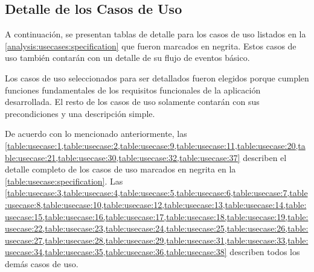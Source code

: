 \subsection{Detalle de los Casos de Uso}
A continuación, se presentan tablas de detalle para los casos de uso listados en la \autoref{analysis:usecases:specification} que fueron marcados en negrita. Estos casos de uso también contarán con un detalle de su flujo de eventos básico.

Los casos de uso seleccionados para ser detallados fueron elegidos porque cumplen funciones fundamentales de los requisitos funcionales de la aplicación desarrollada. El resto de los casos de uso solamente contarán con sus precondiciones y una descripción simple.

De acuerdo con lo mencionado anteriormente, las \cref{table:usecase:1,table:usecase:2,table:usecase:9,table:usecase:11,table:usecase:20,table:usecase:21,table:usecase:30,table:usecase:32,table:usecase:37} describen el detalle completo de los casos de uso marcados en negrita en la \autoref{table:usecase:specification}. Las \cref{table:usecase:3,table:usecase:4,table:usecase:5,table:usecase:6,table:usecase:7,table:usecase:8,table:usecase:10,table:usecase:12,table:usecase:13,table:usecase:14,table:usecase:15,table:usecase:16,table:usecase:17,table:usecase:18,table:usecase:19,table:usecase:22,table:usecase:23,table:usecase:24,table:usecase:25,table:usecase:26,table:usecase:27,table:usecase:28,table:usecase:29,table:usecase:31,table:usecase:33,table:usecase:34,table:usecase:35,table:usecase:36,table:usecase:38} describen todos los demás casos de uso.

%
%

